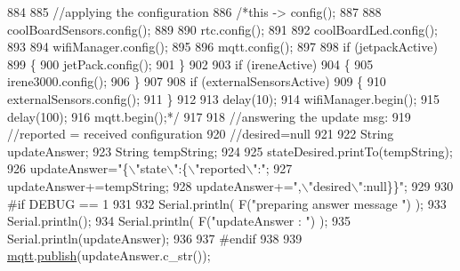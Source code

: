 \begin{DoxyCode}
884 
885             \textcolor{comment}{//applying the configuration    }
886             \textcolor{comment}{/*this -> config();}
887 \textcolor{comment}{}
888 \textcolor{comment}{            coolBoardSensors.config();}
889 \textcolor{comment}{}
890 \textcolor{comment}{            rtc.config();}
891 \textcolor{comment}{}
892 \textcolor{comment}{            coolBoardLed.config();}
893 \textcolor{comment}{            }
894 \textcolor{comment}{            wifiManager.config();}
895 \textcolor{comment}{}
896 \textcolor{comment}{            mqtt.config();}
897 \textcolor{comment}{}
898 \textcolor{comment}{            if (jetpackActive)}
899 \textcolor{comment}{            \{}
900 \textcolor{comment}{                jetPack.config();}
901 \textcolor{comment}{            \}}
902 \textcolor{comment}{}
903 \textcolor{comment}{            if (ireneActive)}
904 \textcolor{comment}{            \{}
905 \textcolor{comment}{                irene3000.config();}
906 \textcolor{comment}{            \}}
907 \textcolor{comment}{}
908 \textcolor{comment}{            if (externalSensorsActive)}
909 \textcolor{comment}{            \{}
910 \textcolor{comment}{                externalSensors.config();}
911 \textcolor{comment}{            \}}
912 \textcolor{comment}{}
913 \textcolor{comment}{            delay(10);}
914 \textcolor{comment}{            wifiManager.begin();}
915 \textcolor{comment}{            delay(100);}
916 \textcolor{comment}{            mqtt.begin();*/}
917 
918                 \textcolor{comment}{//answering the update msg:}
919             \textcolor{comment}{//reported = received configuration}
920             \textcolor{comment}{//desired=null}
921         
922             String updateAnswer;
923             String tempString;
924             
925             stateDesired.printTo(tempString);
926             updateAnswer=\textcolor{stringliteral}{"\{\(\backslash\)"state\(\backslash\)":\{\(\backslash\)"reported\(\backslash\)":"};
927             updateAnswer+=tempString;
928             updateAnswer+=\textcolor{stringliteral}{",\(\backslash\)"desired\(\backslash\)":null\}\}"};
929 
930 \textcolor{preprocessor}{        #if DEBUG == 1}
931 
932             Serial.println( F(\textcolor{stringliteral}{"preparing answer message "}) );
933             Serial.println();
934             Serial.println( F(\textcolor{stringliteral}{"updateAnswer : "}) );
935             Serial.println(updateAnswer);
936         
937 \textcolor{preprocessor}{        #endif  }
938 
939             \hyperlink{classCoolBoard_a2399f44d7c23c1149a335cb3b46d90f1}{mqtt}.\hyperlink{classCoolMQTT_ace977b3e90ab14b1199fe5c4fb0a13ec}{publish}(updateAnswer.c\_str());

\end{DoxyCode}
